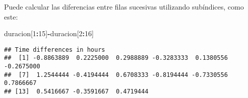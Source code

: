 \documentclass[]{article}
\newenvironment{Shaded}{\begin{snugshade}}{\end{snugshade}}
\newcommand{\DecValTok}[1]{\textcolor[rgb]{0.00,0.00,0.81}{#1}}
\newcommand{\OperatorTok}[1]{\textcolor[rgb]{0.81,0.36,0.00}{\textbf{#1}}}
\newcommand{\NormalTok}[1]{#1}
\begin{document}
Puede calcular las diferencias entre filas sucesivas utilizando
subíndices, como este:

\begin{Shaded}
\begin{Highlighting}[]
\NormalTok{duracion[}\DecValTok{1}\OperatorTok{:}\DecValTok{15}\NormalTok{]}\OperatorTok{-}\NormalTok{duracion[}\DecValTok{2}\OperatorTok{:}\DecValTok{16}\NormalTok{]}
\end{Highlighting}
\end{Shaded}

\begin{verbatim}
## Time differences in hours
##  [1] -0.8863889  0.2225000  0.2988889 -0.3283333  0.1380556 -0.2675000
##  [7]  1.2544444 -0.4194444  0.6708333 -0.8194444 -0.7330556  0.7866667
## [13]  0.5416667 -0.3591667  0.4719444
\end{verbatim}
\end{document}
